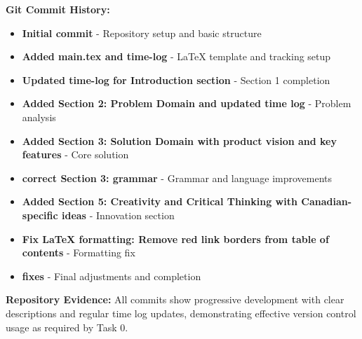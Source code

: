 \documentclass[12pt]{article}
\begin{document}
\textbf{Git Commit History:}
\begin{itemize}
    \item \textbf{Initial commit} - Repository setup and basic structure
    \item \textbf{Added main.tex and time-log} - LaTeX template and tracking setup
    \item \textbf{Updated time-log for Introduction section} - Section 1 completion
    \item \textbf{Added Section 2: Problem Domain and updated time log} - Problem analysis
    \item \textbf{Added Section 3: Solution Domain with product vision and key features} - Core solution
    \item \textbf{correct Section 3: grammar} - Grammar and language improvements
    \item \textbf{Added Section 5: Creativity and Critical Thinking with Canadian-specific ideas} - Innovation section
    \item \textbf{Fix LaTeX formatting: Remove red link borders from table of contents} - Formatting fix
    \item \textbf{fixes} - Final adjustments and completion
\end{itemize}

\textbf{Repository Evidence:}
All commits show progressive development with clear descriptions and regular time log updates, demonstrating effective version control usage as required by Task 0.
\end{document}
